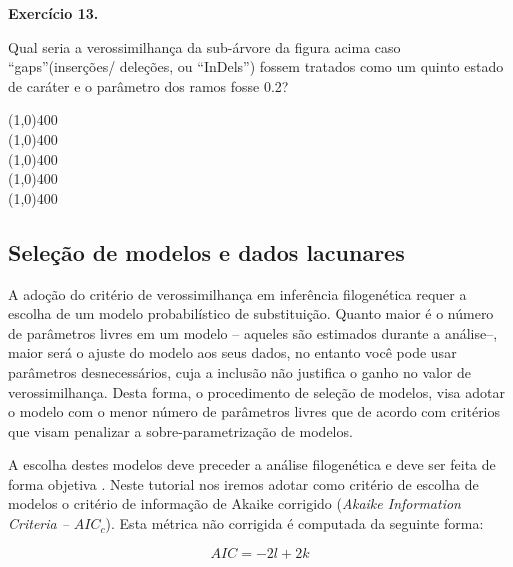 \begin{refsection}
\begin{blackBlock}{\textbf{Exercício 13.}}\label{tut12:ex:13.4}

Qual seria a verossimilhança da sub-árvore da figura acima caso ``gaps''(inserções/ deleções, ou ``InDels'') fossem tratados como um quinto estado de caráter e o parâmetro dos ramos fosse 0.2?

\end{blackBlock}

\begin{center}
\line(1,0){400}\\
\line(1,0){400}\\
\line(1,0){400}\\
\line(1,0){400}\\
\line(1,0){400}\\
\end{center}

\subsection{Seleção de modelos e dados lacunares}\label{tut12:first_sec:model}

A adoção do critério de verossimilhança em inferência filogenética requer a escolha de um modelo probabilístico de substituição. Quanto maior é o número de parâmetros livres em um modelo -- aqueles são estimados durante a análise--, maior será o ajuste do modelo aos seus dados, no entanto você pode usar parâmetros desnecessários, cuja a inclusão não justifica o ganho no valor de verossimilhança. Desta forma, o procedimento de seleção de modelos, visa adotar o modelo com o menor número de parâmetros livres que de acordo com critérios que visam penalizar a sobre-parametrização de modelos.

A escolha destes modelos deve preceder a análise filogenética e deve ser feita de forma objetiva \parencite[veja conceitos e referências em][]{Darriba_and_Posada_2015}. Neste tutorial nos iremos adotar como critério de escolha de modelos o critério de informação de Akaike corrigido (\textit{Akaike Information Criteria -- $AIC_{c}$}). Esta métrica não corrigida é computada da seguinte forma:

\begin{center}
\begin{equation}\label{tut12:first_sec:model_aic}
AIC = -2l + 2k
\end{equation}
\end{center}


\end{refsection}
